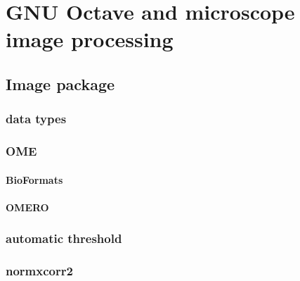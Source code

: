 \chapter{GNU Octave and microscope image processing}
\label{ch:octave}



\section{Image package}
  \subsection{data types}

  \subsection{OME}

    \subsubsection{BioFormats}
    \subsubsection{OMERO}
  \subsection{automatic threshold}
  \subsection{normxcorr2}

